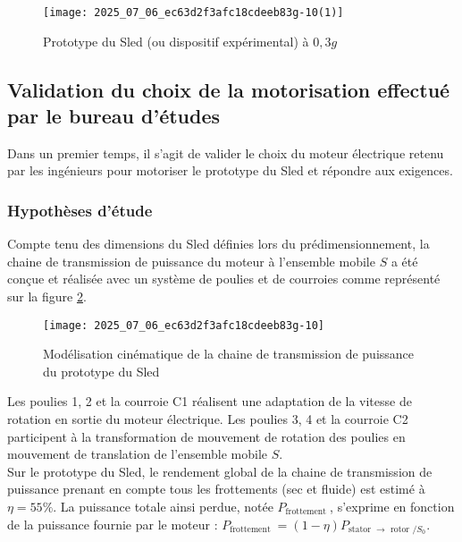 \begin{figure}[!h]
\centering
\texttt{[image: 2025\_07\_06\_ec63d2f3afc18cdeeb83g-10(1)]}

\caption{\label{ccs_mp_2022_fig_13}Prototype du Sled (ou dispositif expérimental) à $0,3 g$}
\end{figure}
\fi

\subsection{Validation du choix de la motorisation effectué par le bureau d'études \label{ccs_mp_2022_sec_4A}}

\ifprof
\else
\begin{obj}
Dans un premier temps, il s'agit de valider le choix du moteur électrique retenu par les ingénieurs pour motoriser le prototype du Sled et répondre aux exigences.
\end{obj}

\subsubsection*{Hypothèses d'étude}
Compte tenu des dimensions du Sled définies lors du prédimensionnement, la chaine de transmission de puissance du moteur à l'ensemble mobile $S$ a été conçue et réalisée avec un système de poulies et de courroies comme représenté sur la figure \ref{ccs_mp_2022_fig_14}.

\begin{figure}[!h]
\centering
\texttt{[image: 2025\_07\_06\_ec63d2f3afc18cdeeb83g-10]}

\caption{\label{ccs_mp_2022_fig_14}Modélisation cinématique de la chaine de transmission de puissance du prototype du Sled}
\end{figure}

Les poulies 1, 2 et la courroie C1 réalisent une adaptation de la vitesse de rotation en sortie du moteur électrique. Les poulies 3, 4 et la courroie C2 participent à la transformation de mouvement de rotation des poulies en mouvement de translation de l'ensemble mobile $S$.\\
Sur le prototype du Sled, le rendement global de la chaine de transmission de puissance prenant en compte tous les frottements (sec et fluide) est estimé à $\eta=55 \%$. La puissance totale ainsi perdue, notée $P_{\text {frottement }}$, s'exprime en fonction de la puissance fournie par le moteur : $P_{\text {frottement }}=(1-\eta) P_{\text {stator } \rightarrow \text { rotor } / S_{0}}$.


